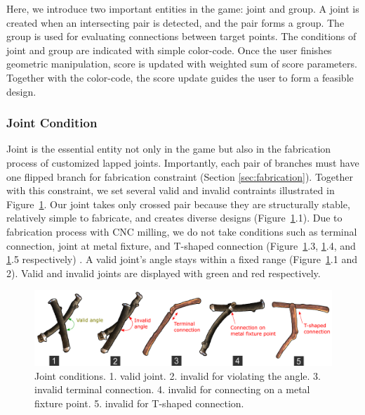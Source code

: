 Here, we introduce two important entities in the game: joint and group.
A joint is created when an intersecting pair is detected, and the pair forms a group.
The group is used for evaluating connections between target points.
The conditions of joint and group are indicated with simple color-code.
Once the user finishes geometric manipulation, score is updated with weighted sum of score parameters.
Together with the color-code, the score update guides the user to form a feasible design.



\subsubsection{Joint Condition}
\label{sec:joint}
Joint is the essential entity not only in the game but also in the fabrication process of customized lapped joints.
Importantly, each pair of branches must have one flipped branch for fabrication constraint (Section \ref{sec:fabrication}).
Together with this constraint, we set several valid and invalid contraints illustrated in Figure~\ref{fig:joint_condition}.
Our joint takes only crossed pair because they are structurally stable, relatively simple to fabricate, and creates diverse designs (Figure~\ref{fig:joint_condition}.1).
Due to fabrication process with CNC milling, we do not take conditions such as terminal connection, joint at metal fixture, and T-shaped connection (Figure~\ref{fig:joint_condition}.3, \ref{fig:joint_condition}.4, and \ref{fig:joint_condition}.5 respectively) .
A valid joint's angle stays within a fixed range (Figure~\ref{fig:joint_condition}.1 and 2).
Valid and invalid joints are displayed with green and red respectively.

\begin{figure}[ht]
	\begin{center}
		\includegraphics[width = 0.4\paperwidth]{images/system/joint_conditions_3.png}
		\caption{Joint conditions. 1. valid joint. 2. invalid for violating the angle. 3. invalid terminal connection. 4. invalid for connecting on a metal fixture point. 5. invalid for T-shaped connection.}
		\label{fig:joint_condition}
	\end{center}
\end{figure}

